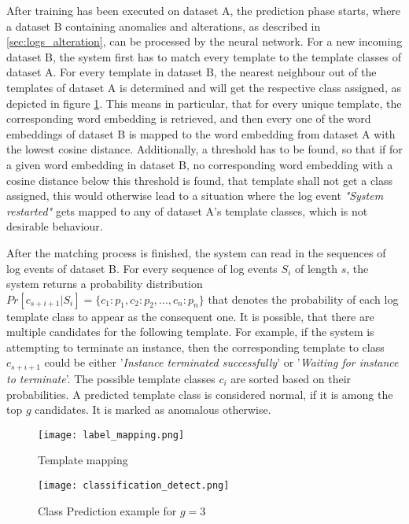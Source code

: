 After training has been executed on dataset A, the prediction phase starts, where a dataset B containing anomalies and alterations, as described in \ref{sec:logs_alteration}, can be processed by the neural network. For a new incoming dataset B, the system first has to match every template to the template classes of dataset A. For every template in dataset B, the nearest neighbour out of the templates of dataset A is determined and will get the respective class assigned, as depicted in figure \ref{fig:label_mapping}. This means in particular, that for every unique template, the corresponding word embedding is retrieved, and then every one of the word embeddings of dataset B is mapped to the word embedding from dataset A with the lowest cosine distance. Additionally, a threshold has to be found, so that if for a given word embedding in dataset B, no corresponding word embedding with a cosine distance below this threshold is found, that template shall not get a class assigned, this would otherwise lead to a situation where the log event \textit{"System restarted"} gets mapped to any of dataset A's template classes, which is not desirable behaviour.

After the matching process is finished, the system can read in the sequences of log events of dataset B. For every sequence of log events $S_i$ of length $s$, the system returns a probability distribution $Pr[c_{s+i+1}|S_i] = \{c_1 : p_1, c_2 : p_2, ..., c_n : p_n\}$ that denotes the probability of each log template class to appear as the consequent one. It is possible, that there are multiple candidates for the following template. For example, if the system is attempting to terminate an instance, then the corresponding template to class $c_{s+i+1}$ could be either '\textit{Instance terminated successfully}' or '\textit{Waiting for instance to terminate}'. The possible template classes $c_i$ are sorted based on their probabilities. A predicted template class is considered normal, if it is among the top $g$ candidates. It is marked as anomalous otherwise.
 

\begin{figure}[H]
	\centering
	\captionsetup{justification=centering}
	\texttt{[image: label\_mapping.png]}
	\caption{Template mapping}
	\label{fig:label_mapping}
\end{figure}

\begin{figure}[H]
	\centering	
	\texttt{[image: classification\_detect.png]}
	\caption{Class Prediction example for $g=3$}
	\label{fig:class_prediction}
\end{figure}

